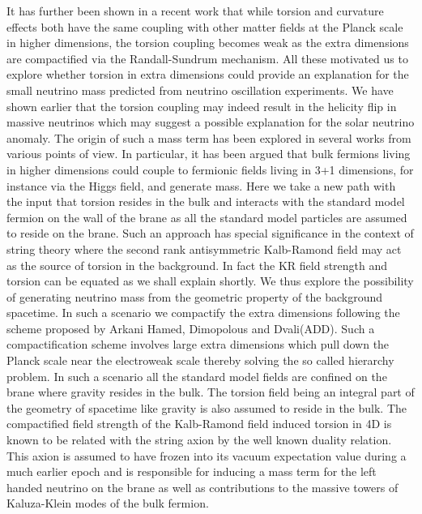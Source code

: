 \documentclass[a4paper,12pt]{article}
\begin{document}
It has further been shown in a recent work that while torsion and
curvature effects both have the same coupling with other matter
fields at the Planck scale in higher dimensions, the torsion
coupling becomes weak as the extra dimensions are
compactified\cite{rs} via the Randall-Sundrum
mechanism\cite{bmssssg}. All these motivated us to explore
whether torsion in extra dimensions could provide an explanation
for the small neutrino mass predicted from neutrino oscillation
experiments. We have shown earlier that the torsion coupling may
indeed result in the helicity flip\cite{ssgas} in massive
neutrinos which may suggest a possible explanation for the solar
neutrino anomaly. The origin of such a mass term has been explored
in several works from various points of
view\cite{Dienes,Mohapatra}. In particular, it has been argued
that bulk fermions living in higher dimensions could couple to
fermionic fields living in 3+1 dimensions, for instance via the
Higgs field, and generate mass\cite{addmass,kddug}. Here we take a
new path with the input that torsion resides in the bulk and
interacts with the standard model fermion on the wall of the brane
as all the standard model particles are assumed to reside on the
brane. Such an approach has special significance in the context
of string theory where the second rank antisymmetric Kalb-Ramond
field may act as the source of torsion in the background. In fact
the KR field strength and torsion can be equated as we shall
explain shortly. We thus explore the possibility of generating
neutrino mass from the geometric property of the background
spacetime. In such a scenario we compactify the extra dimensions
following the scheme proposed by Arkani Hamed, Dimopolous and
Dvali(ADD)\cite{add}. Such a compactification scheme involves
large extra dimensions which pull down the Planck scale near the
electroweak scale thereby solving the so called hierarchy
problem. In such a scenario all the standard model fields are
confined on the brane where gravity resides in the bulk. The
torsion field being an integral part of the geometry of spacetime
like gravity is also assumed to reside in the bulk. The
compactified field strength of the Kalb-Ramond field induced
torsion in 4D is known to be related with the string axion by the
well known duality relation. This axion is assumed to have frozen
into its vacuum expectation value during a much earlier epoch and
is responsible for inducing a mass term for the left handed
neutrino on the brane as well as contributions to the massive
towers of Kaluza-Klein modes of the bulk fermion.
\end{document}
